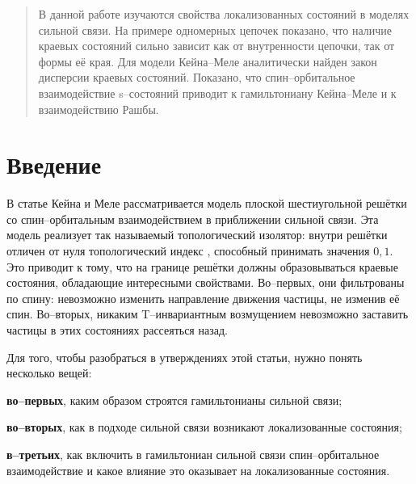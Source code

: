 	\newpage
	\begin{abstract}
		В данной работе изучаются свойства локализованных состояний в 
		моделях сильной связи. На примере одномерных цепочек показано,
		что наличие краевых состояний сильно зависит как от внутренности
		цепочки, так от формы её края. Для модели Кейна--Меле 
		аналитически найден закон дисперсии краевых состояний. Показано,
		что спин--орбитальное взаимодействие s--состояний приводит
		к гамильтониану Кейна--Меле и к взаимодействию Рашбы.
	\end{abstract}
	\section{Введение}
	В статье Кейна и Меле \cite{Kane2005} рассматривается модель плоской 
	шестиугольной решётки со спин--орбитальным 
	взаимодействием в приближении сильной связи. Эта модель реализует так называемый
	топологический изолятор: внутри решётки отличен от нуля топологический индекс 
	\cite{Hasan2010},
	способный принимать значения $0, 1$. Это приводит к тому, что на границе решётки 
	должны образовываться краевые состояния, обладающие интересными свойствами.
	Во--первых, они фильтрованы по спину: невозможно изменить направление движения
	частицы, не изменив её спин. Во--вторых, никаким T--инвариантным возмущением 
	невозможно заставить частицы в этих состояниях рассеяться назад.

	Для того, чтобы разобраться в утверждениях
	этой статьи, нужно понять несколько вещей:

	{\bf во--первых}, каким образом строятся гамильтонианы сильной связи;

	{\bf во--вторых}, как в подходе сильной связи возникают локализованные
	состояния;

	{\bf в--третьих}, как включить в гамильтониан сильной связи спин--орбитальное 
	взаимодействие и какое влияние это оказывает на локализованные состояния.
